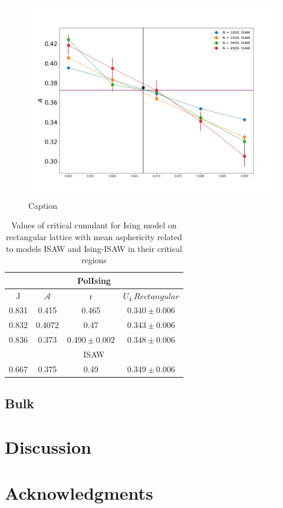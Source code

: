 \documentclass[aps,pre,amssymb,amsmath,twocolumn,floatfix]{revtex4-2}
\begin{document}
\begin{figure}[h]
    \centering
    \includegraphics[width=\columnwidth]{Images/ISAW_A_J_Close.png}
    \caption{Caption}
    \label{fig:my_label}
\end{figure}



\begin{table}[h!]
    \centering
    \begin{tabular}{|c|c|c|c|}
        \hline
         \multicolumn{4}{|c|}{PolIsing}  \\ \hline
         J & $\mathcal{A}$ & r & $U_{4}\  Rectangular$ \\ \hline
         0.831 & 0.415 & 0.465 & $0.340 \pm 0.006$\\ \hline
         0.832 & 0.4072 & 0.47 & $0.343 \pm 0.006$\\ \hline
         0.836 & 0.373 & $0.490 \pm 0.002$ & $0.348 \pm 0.006$\\ \hline
         \multicolumn{4}{|c|}{ISAW} \\ \hline
         0.667 & 0.375 & 0.49 & $0.349 \pm 0.006$ \\ \hline
    \end{tabular}
    \caption{Values of critical cumulant for Ising model on rectangular lattice with mean asphericity related to models ISAW and Ising-ISAW in their critical regions}
    \label{tab:my_label}
\end{table}

\subsection{Bulk}

\section{Discussion}

\section{Acknowledgments}


\end{document}
